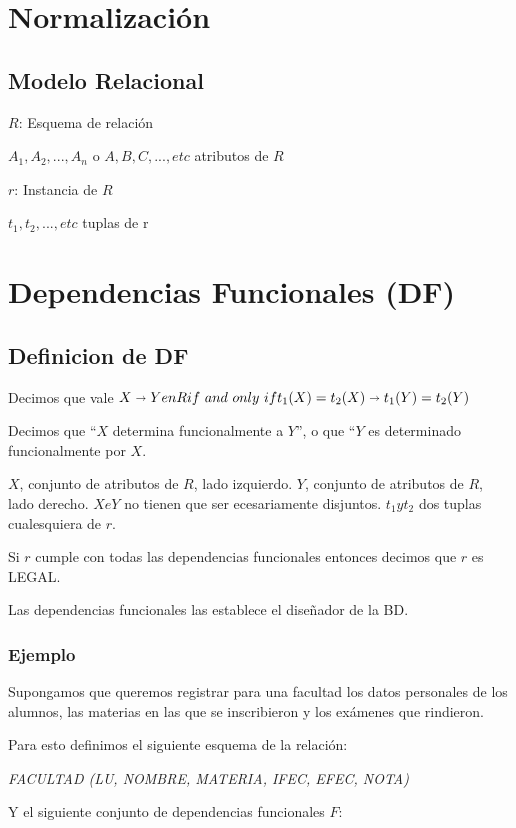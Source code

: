 \documentclass[10pt, a4paper,english,spanish]{article}
\newcommand{\imp}{\shortrightarrow}
\begin{document}
\section{Normalizaci\'on}

\subsection{Modelo Relacional}

$R$: Esquema de relaci\'on

$A_{1}, A_{2}, ..., A_n$ o $A, B, C, ..., etc$ atributos de $R$

$r$: Instancia de $R$

$t_1, t_2, ..., etc$ tuplas de r

\section{Dependencias Funcionales (DF)}
\subsection{Definicion de DF}

Decimos que vale $X \imp Y en R \iff t_1(X)=t_2(X) \imp t_1(Y)=t_2(Y)$ 

Decimos que ``$X$ determina funcionalmente a $Y$'', o que ``$Y$ es determinado funcionalmente por $X$.

$X$, conjunto de atributos de $R$, lado izquierdo.
$Y$, conjunto de atributos de $R$, lado derecho.
$X e Y$ no tienen que ser ecesariamente disjuntos.
$t_1 y t_2$ dos tuplas cualesquiera de $r$.

Si $r$ cumple con todas las dependencias funcionales entonces decimos que $r$ es LEGAL.

Las dependencias funcionales las establece el dise\~nador de la BD.

\subsubsection{Ejemplo}
Supongamos que queremos registrar para una facultad los datos personales de los alumnos, las materias en las que se inscribieron y los ex\'amenes que rindieron.

Para esto definimos el siguiente esquema de la relaci\'on:

\textit{FACULTAD (LU, NOMBRE, MATERIA, IFEC, EFEC, NOTA)}

Y el siguiente conjunto de dependencias funcionales $F$:
\end{document}
